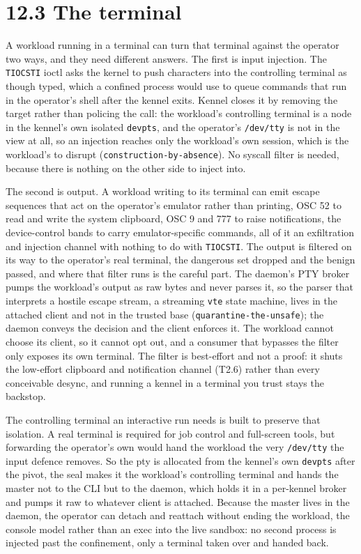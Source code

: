 \hypertarget{the-terminal}{%
\section{12.3 The terminal}\label{the-terminal}}

A workload running in a terminal can turn that terminal against the
operator two ways, and they need different answers. The first is input
injection. The \texttt{TIOCSTI} ioctl asks the kernel to push characters
into the controlling terminal as though typed, which a confined process
would use to queue commands that run in the operator's shell after the
kennel exits. Kennel closes it by removing the target rather than
policing the call: the workload's controlling terminal is a node in the
kennel's own isolated \texttt{devpts}, and the operator's
\texttt{/dev/tty} is not in the view at all, so an injection reaches
only the workload's own session, which is the workload's to disrupt
(\texttt{construction-by-absence}). No syscall filter is needed, because
there is nothing on the other side to inject into.

The second is output. A workload writing to its terminal can emit escape
sequences that act on the operator's emulator rather than printing, OSC
52 to read and write the system clipboard, OSC 9 and 777 to raise
notifications, the device-control bands to carry emulator-specific
commands, all of it an exfiltration and injection channel with nothing
to do with \texttt{TIOCSTI}. The output is filtered on its way to the
operator's real terminal, the dangerous set dropped and the benign
passed, and where that filter runs is the careful part. The daemon's PTY
broker pumps the workload's output as raw bytes and never parses it, so
the parser that interprets a hostile escape stream, a streaming
\texttt{vte} state machine, lives in the attached client and not in the
trusted base (\texttt{quarantine-the-unsafe}); the daemon conveys the
decision and the client enforces it. The workload cannot choose its
client, so it cannot opt out, and a consumer that bypasses the filter
only exposes its own terminal. The filter is best-effort and not a
proof: it shuts the low-effort clipboard and notification channel (T2.6)
rather than every conceivable desync, and running a kennel in a terminal
you trust stays the backstop.

The controlling terminal an interactive run needs is built to preserve
that isolation. A real terminal is required for job control and
full-screen tools, but forwarding the operator's own would hand the
workload the very \texttt{/dev/tty} the input defence removes. So the
pty is allocated from the kennel's own \texttt{devpts} after the pivot,
the seal makes it the workload's controlling terminal and hands the
master not to the CLI but to the daemon, which holds it in a per-kennel
broker and pumps it raw to whatever client is attached. Because the
master lives in the daemon, the operator can detach and reattach without
ending the workload, the console model rather than an exec into the live
sandbox: no second process is injected past the confinement, only a
terminal taken over and handed back.

